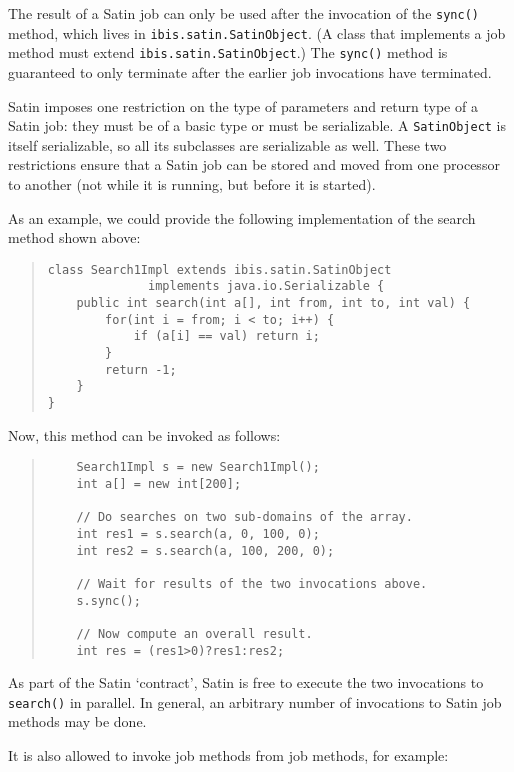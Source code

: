 \documentclass[10pt]{article}
\begin{document}
The result of a Satin job can only be used after the invocation
of the \texttt{sync()} method, which lives in \texttt{ibis.satin.SatinObject}.
(A class that implements a job method must extend
\texttt{ibis.satin.SatinObject}.)
The \texttt{sync()}
method is guaranteed to only terminate after the earlier job
invocations have terminated.

Satin imposes one restriction on the type of parameters and return type
of a Satin job: they must be of a basic type or must be serializable.
A \texttt{SatinObject} is itself serializable, so all its subclasses
are serializable as well.
These two restrictions ensure that a Satin job can be stored and
moved from one processor to another (not while it is running, but before
it is started).

As an example, we could provide the following implementation of the
search method shown above:

\begin{quote}
\begin{verbatim}
class Search1Impl extends ibis.satin.SatinObject
              implements java.io.Serializable {
    public int search(int a[], int from, int to, int val) {
        for(int i = from; i < to; i++) {
            if (a[i] == val) return i;
        }
        return -1;
    }
}
\end{verbatim}
\end{quote}

Now, this method can be invoked as follows:

\begin{quote}
\begin{verbatim}
    Search1Impl s = new Search1Impl();
    int a[] = new int[200];

    // Do searches on two sub-domains of the array.
    int res1 = s.search(a, 0, 100, 0);
    int res2 = s.search(a, 100, 200, 0);

    // Wait for results of the two invocations above.
    s.sync();

    // Now compute an overall result.
    int res = (res1>0)?res1:res2;
\end{verbatim}
\end{quote}

As part of the Satin `contract', Satin is free to execute the two
invocations to \texttt{search()} in parallel.
In general, an arbitrary number of
invocations to Satin job methods may be done.

It is also allowed to invoke job methods from job methods, for example:
\end{document}

